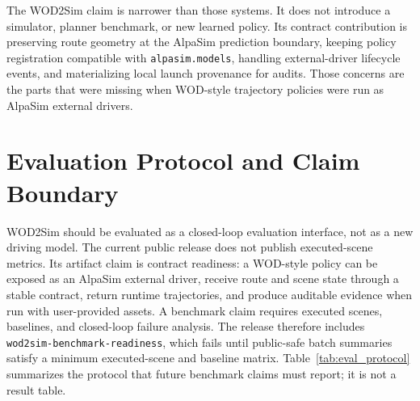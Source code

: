 \documentclass{article}
\begin{document}
The WOD2Sim claim is narrower than those systems. It does not introduce a simulator,
planner benchmark, or new learned policy. Its contract contribution is preserving route
geometry at the AlpaSim prediction boundary, keeping policy registration compatible with
\texttt{alpasim.models}, handling external-driver lifecycle events, and materializing
local launch provenance for audits. Those concerns are the parts that were missing when
WOD-style trajectory policies were run as AlpaSim external drivers.

\section{Evaluation Protocol and Claim Boundary}

WOD2Sim should be evaluated as a closed-loop evaluation interface, not as a new driving
model. The current public release does not publish executed-scene metrics. Its artifact
claim is contract readiness: a WOD-style policy can be exposed as an AlpaSim external
driver, receive route and scene state through a stable contract, return runtime
trajectories, and produce auditable evidence when run with user-provided assets. A
benchmark claim requires executed scenes, baselines, and closed-loop failure analysis.
The release therefore includes \texttt{wod2sim-benchmark-readiness}, which fails until
public-safe batch summaries satisfy a minimum executed-scene and baseline matrix.
Table~\ref{tab:eval_protocol} summarizes the protocol that future benchmark claims must
report; it is not a result table.
\end{document}
